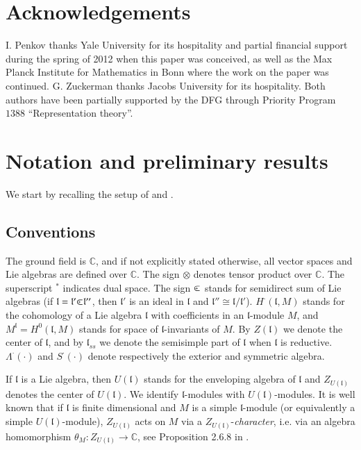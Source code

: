 \documentclass[10pt]{amsart}
\newcommand{\field}[1]{\mathbb{#1}}
\renewcommand{\ll}{\mathfrak{l}}
\def\clplus{\hbox{$\subset${\raise0.3ex\hbox{\kern -0.55em ${\scriptscriptstyle +}$}}\ }}
\begin{document}
\section*{Acknowledgements}\label{sect:acknow.}
I. Penkov thanks Yale University for its hospitality and partial financial support during the spring of 2012 when this paper was conceived, as well as the Max Planck Institute for Mathematics in Bonn where the work on the paper was continued. G. Zuckerman thanks Jacobs University for its hospitality. Both authors have been partially supported by the DFG through Priority Program $1388$ ``Representation theory''.
 
\vspace{2cm}
 
\section{Notation and preliminary results}\label{sect:1}
We start by recalling the setup of \cite{PZ2} and \cite{PZ5}.
\subsection{Conventions}\label{sect:1.1}

The ground field is $\field{C}$, and if not explicitly stated otherwise, all vector spaces and Lie algebras are defined over $\field{C}$. The sign $\otimes$ denotes tensor product over $\field{C}$. The superscript $^*$ indicates dual space. The sign $\clplus$ stands for semidirect sum of Lie algebras (if $\ll=\ll '\clplus\ll ''$, then $\ll '$ is an ideal in $\ll$ and $\ll ''\cong\ll /\ll '$). $H^\cdot(\ll,M)$ stands for the cohomology of a Lie algebra $\ll$ with coefficients in an $\ll$-module $M$, and $M^\ll=H^0(\ll,M)$ stands for space of $\ll$-invariants of $M$. By $Z(\ll)$ we denote the center of $\ll$, and by $\ll_{ss}$ we denote the semisimple part of $\ll$ when $\ll$ is reductive. $\Lambda^\cdot(\cdot)$ and $S^\cdot(\cdot)$ denote respectively the exterior and symmetric algebra.

If $\ll$ is a Lie algebra, then $U(\ll)$ stands for the enveloping algebra of $\ll$ and $Z_{U(\ll)}$ denotes the center of $U(\ll)$. We identify $\ll$-modules with $U(\ll)$-modules. It is well known that if $\ll$ is finite dimensional and $M$ is a simple $\ll$-module (or equivalently a simple $U(\ll)$-module), $Z_{U(\ll)}$ acts on $M$ via a $Z_{U(\ll)}$-\textit{character}, i.e. via an algebra homomorphism $\theta_{M}: Z_{U(\ll)}\rightarrow\field{C}$, see Proposition 2.6.8 in \cite{Dix}.
\end{document}
